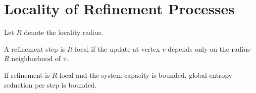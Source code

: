 \section{Locality of Refinement Processes}

Let \(R\) denote the locality radius.

\begin{definition}
A refinement step is \(R\)-local if the update at vertex \(v\) depends only on the radius-\(R\) neighborhood of \(v\).
\end{definition}

\begin{theorem}
If refinement is \(R\)-local and the system capacity is bounded, global entropy reduction per step is bounded.
\end{theorem}
